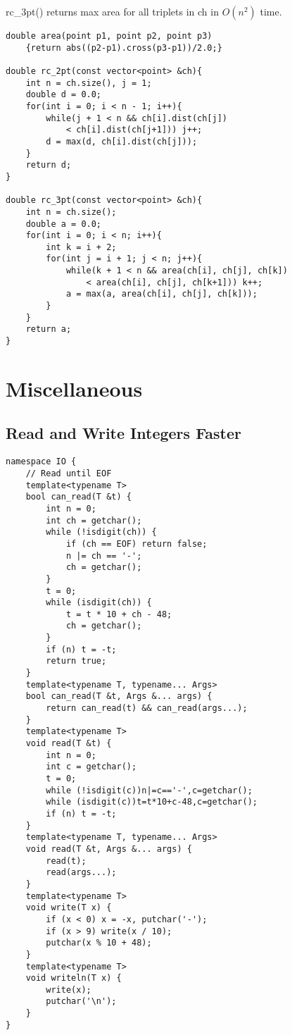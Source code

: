\documentclass[10pt]{article}{\twocolumn}
\begin{document}
\noindent rc\_3pt() returns max area for all triplets in ch in $O(n^2)$ time.
\begin{lstlisting}
double area(point p1, point p2, point p3)
    {return abs((p2-p1).cross(p3-p1))/2.0;}
    
double rc_2pt(const vector<point> &ch){
    int n = ch.size(), j = 1;
    double d = 0.0;
    for(int i = 0; i < n - 1; i++){
        while(j + 1 < n && ch[i].dist(ch[j])
            < ch[i].dist(ch[j+1])) j++;
        d = max(d, ch[i].dist(ch[j]));
    }
    return d;
}

double rc_3pt(const vector<point> &ch){
    int n = ch.size();
    double a = 0.0;
    for(int i = 0; i < n; i++){
        int k = i + 2;
        for(int j = i + 1; j < n; j++){
            while(k + 1 < n && area(ch[i], ch[j], ch[k])
                < area(ch[i], ch[j], ch[k+1])) k++;
            a = max(a, area(ch[i], ch[j], ch[k]));
        }
    }
    return a;
}
\end{lstlisting}


\section{Miscellaneous}

\subsection{Read and Write Integers Faster}
\begin{lstlisting}
namespace IO {
    // Read until EOF
    template<typename T>
    bool can_read(T &t) {
        int n = 0;
        int ch = getchar();
        while (!isdigit(ch)) {
            if (ch == EOF) return false;
            n |= ch == '-';
            ch = getchar();
        }
        t = 0;
        while (isdigit(ch)) {
            t = t * 10 + ch - 48;
            ch = getchar();
        }
        if (n) t = -t;
        return true;
    }
    template<typename T, typename... Args>
    bool can_read(T &t, Args &... args) {
        return can_read(t) && can_read(args...);
    }
    template<typename T>
    void read(T &t) {
        int n = 0;
        int c = getchar();
        t = 0;
        while (!isdigit(c))n|=c=='-',c=getchar();
        while (isdigit(c))t=t*10+c-48,c=getchar();
        if (n) t = -t;
    }
    template<typename T, typename... Args>
    void read(T &t, Args &... args) {
        read(t);
        read(args...);
    }
    template<typename T>
    void write(T x) {
        if (x < 0) x = -x, putchar('-');
        if (x > 9) write(x / 10);
        putchar(x % 10 + 48);
    }
    template<typename T>
    void writeln(T x) {
        write(x);
        putchar('\n');
    }
}
\end{lstlisting}
\end{document}
